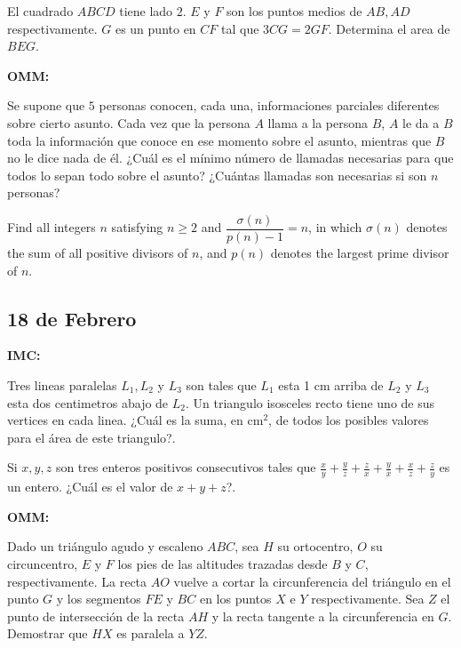 \documentclass[11pt]{scrartcl}
\begin{document}
\begin{problem} [IMC 2006/8]
    El cuadrado $ABCD$ tiene lado $2$. $E$ y $F$ son los puntos medios de $AB,AD$ respectivamente. $G$ es un punto en $CF$ tal que $3CG=2GF$. Determina el area de $BEG$.
\end{problem}

\textbf{OMM:}
\begin{problem} [OMCC 1999/1]
    
    Se supone que $5$ personas conocen, cada una, informaciones parciales diferentes sobre cierto asunto. Cada vez que la persona $A$ llama a la persona $B$, $A$ le da a $B$ toda la información que conoce en ese momento sobre el asunto, mientras que $B$ no le dice nada de él. ¿Cuál es el mínimo número de llamadas necesarias para que todos lo sepan todo sobre el asunto? ¿Cuántas llamadas son necesarias si son $n$ personas?
\end{problem}

\begin{problem} [APMO 2023/2]
    Find all integers $n$ satisfying $n \geq 2$ and $\dfrac{\sigma(n)}{p(n)-1} = n$, in which $\sigma(n)$ denotes the sum of all positive divisors of $n$, and $p(n)$ denotes the largest prime divisor of $n$.
\end{problem}

\newpage
\subsection{18 de Febrero }

\textbf{IMC:}
\begin{problem} [IMC 2016/9]
    Tres lineas paralelas $L_1, L_2$ y $L_3$ son tales que $L_1$ esta 1 cm arriba de $L_2$ y $L_3$ esta dos centimetros abajo de $L_2$. Un triangulo isosceles recto tiene uno de sus vertices en cada linea. ¿Cuál es la suma, en $\text{cm}^2$, de todos los posibles valores para el área de este triangulo?.
\end{problem}

\begin{problem} [IMC 2014/6]
    Si $x,y,z$ son tres enteros positivos consecutivos tales que $\frac xy+\frac yz+\frac zx +\frac yx+\frac xz+\frac zy$ es un entero. ¿Cuál es el valor de $x+y+z$?.
\end{problem}

\textbf{OMM:}
\begin{problem} [OMCC 2009/5]
    
    Dado un triángulo agudo y escaleno $ ABC$, sea $ H$ su ortocentro, $ O$ su circuncentro, $ E$ y $ F$ los pies de las altitudes trazadas desde $ B$ y $ C$, respectivamente. La recta $ AO$ vuelve a cortar la circunferencia del triángulo en el punto $ G$ y los segmentos $ FE$ y $ BC$ en los puntos $ X$ e $ Y$ respectivamente. Sea $ Z$ el punto de intersección de la recta $ AH$ y la recta tangente a la circunferencia en $ G$. Demostrar que $ HX$ es paralela a $ YZ$.
\end{problem}
\end{document}
